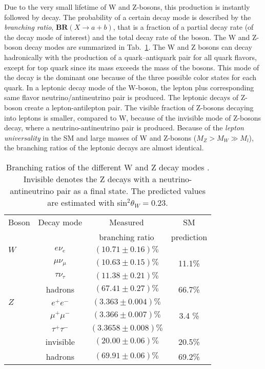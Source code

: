 Due to the very small lifetime of W and Z-bosons, this production is instantly followed by decay. 
The probability of a certain decay mode is described by the \textit{branching ratio}, $\textbf{BR}(X\to a+b)$, that is a fraction of a partial decay rate (of the decay mode of interest) and the total decay rate of the boson.  The W and Z-boson decay modes are summarized in Tab.~\ref{tab:WZDecayModes}. The W and Z bosons can decay hadronically with the production of a quark--antiquark pair for all quark flavors, except for top quark since its mass exceeds the mass of the bosons.  This mode of the decay is the dominant one because of the three possible color states for each quark. In a leptonic decay mode of the W-boson, the lepton plus corresponding same flavor neutrino/antineutrino  pair is produced. The leptonic decays of Z-boson create a lepton-antilepton pair. The visible fraction of Z-bosons decaying into leptons is smaller, compared to W, because of the invisible mode of Z-bosons decay, where a neutrino-antineutrino pair is produced. Because of the \textit{lepton universality} in the SM and large masses of W and Z-bosons ($M_Z > M_W \gg M_l$), the branching ratios of the leptonic decays are almost identical.

\begin{table}[!tbp]
\begin{center}
\caption{Branching ratios of the different W and Z decay modes \cite{Agashe:2014kda}. Invisible denotes the Z decays with a neutrino-antineutrino pair as a final state. The predicted values are estimated with sin$^2\theta_W = 0.23$.}
\label{tab:WZDecayModes}
\begin{tabular}{l | c | c | c }
\hline
Boson & Decay mode & Measured & SM \\
	& & branching ratio & prediction \\
\hline
$W$ & $e\nu_e$ & $(10.71\pm0.16)\%$ & \\
    & $\mu\nu_{\mu}$ & $(10.63\pm0.15)\%$ & 11.1\% \\
    & $\tau \nu_{\tau}$ & $(11.38\pm0.21)\%$ & \\
    & hadrons & $(67.41\pm0.27)\%$& 66.7\% \\
 \hline
 $Z$ & $e^+e^-$ & $(3.363\pm0.004)\%$ & \\
 	& $\mu^+\mu^-$ & $(3.366\pm0.007)\%$ & 3.4 \% \\
 	& $\tau^+ \tau^-$ & $(3.3658\pm0.008)\%$ & \\
 	& invisible & $(20.00\pm0.06)\%$ & 20.5\% \\
 	& hadrons & $(69.91\pm0.06)\%$ & 69.2\% \\
 \hline 
\end{tabular}
\end{center}
\end{table}

